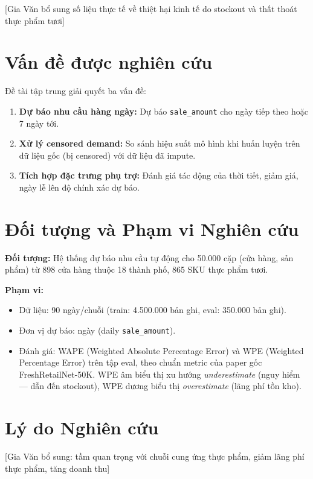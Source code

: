 \documentclass[12pt,a4paper]{report}
\begin{document}
[Gia Văn bổ sung số liệu thực tế về thiệt hại kinh tế do stockout và thất thoát thực phẩm tươi]

\section{Vấn đề được nghiên cứu}

Đề tài tập trung giải quyết ba vấn đề:
\begin{enumerate}
    \item \textbf{Dự báo nhu cầu hàng ngày:} Dự báo \texttt{sale\_amount} cho ngày tiếp theo hoặc 7 ngày tới.
    \item \textbf{Xử lý censored demand:} So sánh hiệu suất mô hình khi huấn luyện trên dữ liệu gốc (bị censored) với dữ liệu đã impute.
    \item \textbf{Tích hợp đặc trưng phụ trợ:} Đánh giá tác động của thời tiết, giảm giá, ngày lễ lên độ chính xác dự báo.
\end{enumerate}

\section{Đối tượng và Phạm vi Nghiên cứu}

\textbf{Đối tượng:} Hệ thống dự báo nhu cầu tự động cho 50.000 cặp (cửa hàng, sản phẩm) từ 898 cửa hàng thuộc 18 thành phố, 865 SKU thực phẩm tươi.

\textbf{Phạm vi:}
\begin{itemize}
    \item Dữ liệu: 90 ngày/chuỗi (train: 4.500.000 bản ghi, eval: 350.000 bản ghi).
    \item Đơn vị dự báo: ngày (daily \texttt{sale\_amount}).
    \item Đánh giá: WAPE (Weighted Absolute Percentage Error) và WPE (Weighted Percentage Error) trên tập eval, theo chuẩn metric của paper gốc FreshRetailNet-50K. WPE âm biểu thị xu hướng \textit{underestimate} (nguy hiểm — dẫn đến stockout), WPE dương biểu thị \textit{overestimate} (lãng phí tồn kho).
\end{itemize}

\section{Lý do Nghiên cứu}

[Gia Văn bổ sung: tầm quan trọng với chuỗi cung ứng thực phẩm, giảm lãng phí thực phẩm, tăng doanh thu]

\newpage
\end{document}
